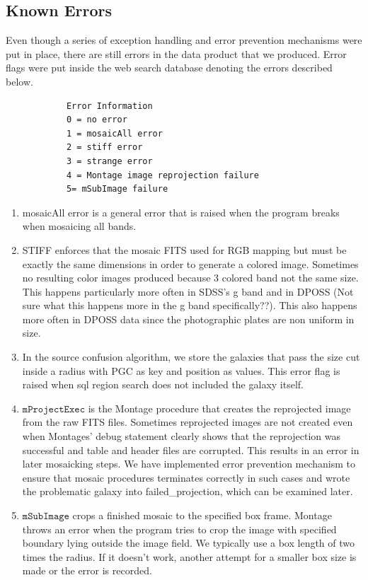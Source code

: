 \documentclass[5p]{elsarticle}
\begin{document}
	\subsection{Known Errors}
	Even though a series of exception handling and error prevention mechanisms were put in place,  there are still errors in the data product that we produced. Error flags were put inside the web search database denoting the errors described below.
	\begin{verbatim}
			Error Information
			0 = no error
			1 = mosaicAll error
			2 = stiff error 
			3 = strange error
			4 = Montage image reprojection failure
			5= mSubImage failure
	\end{verbatim}
	 	\begin{enumerate}
	 	\item  mosaicAll error is a general error that is raised when the program breaks when mosaicing all bands.
	 	\item  STIFF  enforces that the mosaic FITS used for RGB mapping but must be exactly the same dimensions in order to generate a colored image. Sometimes no resulting color images produced because 3 colored band not the same size. This happens particularly more often in SDSS's g band and in DPOSS (Not sure what this happens more in the g band specifically??). This also happens more often in DPOSS data since the photographic plates are non uniform in size. 
	 	\item  In the source confusion algorithm, we store the galaxies that pass the size cut inside a radius with PGC as key and position as values. This error flag is raised when sql region search does not included the galaxy itself. 
	 	\item  $\texttt{mProjectExec}$ is the Montage procedure that creates the reprojected image from the raw FITS files. Sometimes reprojected images are not created even when Montages' debug statement clearly shows that the reprojection was successful and table and header files are corrupted. This results in an error in later mosaicking steps. We have implemented error prevention mechanism to ensure that mosaic procedures terminates correctly in such cases and wrote the problematic galaxy into failed\_projection, which can be examined later. 
	 	\item  $\texttt{mSubImage}$ crops a finished mosaic to the specified box frame. Montage throws an error when the program tries to crop the image with specified boundary lying outside the image field. We typically use a box length of two times the radius. If it doesn't work, another attempt for a smaller box size is made or the error is recorded. 
	 	\end{enumerate}
	 	
\end{document}
